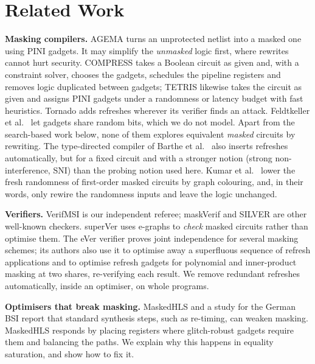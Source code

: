 \documentclass[conference]{IEEEtran}
\begin{document}
\section{Related Work}\label{sec:related}
\textbf{Masking compilers.} AGEMA \cite{knichel2021agema} turns an unprotected netlist into a masked one using PINI gadgets. It may simplify the \emph{unmasked} logic first, where rewrites cannot hurt security. COMPRESS \cite{cassiers2024compress} takes a Boolean circuit as given and, with a constraint solver, chooses the gadgets, schedules the pipeline registers and removes logic duplicated between gadgets; TETRIS \cite{sarma2026tetris} likewise takes the circuit as given and assigns PINI gadgets under a randomness or latency budget with fast heuristics. Tornado \cite{belaid2020tornado} adds refreshes wherever its verifier finds an attack. Feldtkeller et al.\ \cite{feldtkeller2022} let gadgets share random bits, which we do not model. Apart from the search-based work below, none of them explores equivalent \emph{masked} circuits by rewriting. The type-directed compiler of Barthe et al.\ \cite{barthe2016sni} also inserts refreshes automatically, but for a fixed circuit and with a stronger notion (strong non-interference, SNI) than the probing notion used here. Kumar et al.\ \cite{kumar2025graph} lower the fresh randomness of first-order masked circuits by graph colouring, and, in their words, only rewire the randomness inputs and leave the logic unchanged.

\textbf{Verifiers.} VerifMSI \cite{meunier2023verifmsi} is our independent referee; maskVerif \cite{barthe2019maskverif} and SILVER \cite{knichel2020silver} are other well-known checkers. superVer \cite{treff2024supver} uses e-graphs to \emph{check} masked circuits rather than optimise them. The eVer verifier \cite{gourjon2026ever} proves joint independence for several masking schemes; its authors also use it to optimise away a superfluous sequence of refresh applications and to optimise refresh gadgets for polynomial and inner-product masking at two shares, re-verifying each result. We remove redundant refreshes automatically, inside an optimiser, on whole programs.

\textbf{Optimisers that break masking.} MaskedHLS \cite{sarma2024maskedhls} and a study for the German BSI \cite{oberhansl2024study} report that standard synthesis steps, such as re-timing, can weaken masking. MaskedHLS responds by placing registers where glitch-robust gadgets require them and balancing the paths. We explain why this happens in equality saturation, and show how to fix it.
\end{document}
